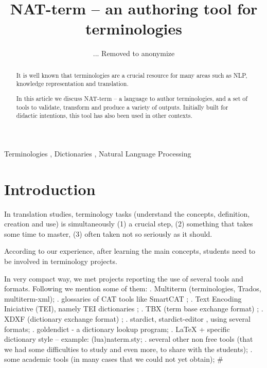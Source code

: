 \documentclass{ceurart}
\begin{document}


\title{NAT-term -- an authoring tool for terminologies}

\author{ ... Removed to anonymize }


\begin{abstract}
It is well known that terminologies are a crucial resource for many areas 
such as NLP, knowledge representation and translation.

In this article we discuss NAT-term -- a language to author terminologies,
and a set of tools to validate, transform and produce a variety of outputs.
Initially built for didactic intentions, this tool has also been used in other contexts. 
\end{abstract}
\begin{keywords}
Terminologies           \sep
Dictionaries            \sep
Natural Language Processing
\end{keywords}

\maketitle 

\section{Introduction}
In translation studies, 
terminology tasks (understand the concepts, definition, creation and use) is simultaneously 
(1) a crucial step, (2) something that takes some time to master, (3) often taken 
not so seriously as it should.


According to our experience, after learning the main concepts, 
students need to be involved in terminology projects. 

In very compact way, we met projects reporting the use of several tools and
formats. Following we mention some of them:
. Multiterm (terminologies, Trados, multiterm-xml);
. glossaries of CAT tools like SmartCAT \cite{smartcatgloss};
. Text Encoding Iniciative (TEI), namely TEI dictionaries \cite{TEI,TEIDIC};
. TBX (term base exchange format) \cite{tbx};
. XDXF (dictionary exchange format) \cite{xdxf};
. stardict, stardict-editor \cite{stardict}, using several formats;
. goldendict \cite{goldendict} - a dictionary lookup program;
. LaTeX + specific dictionary style -- example: (lua)naterm.sty;
. several other non free tools (that we had some difficulties to study and
   even more, to share with the students);
. some academic tools (in many cases that we could not yet obtain);
#
\end{document}
